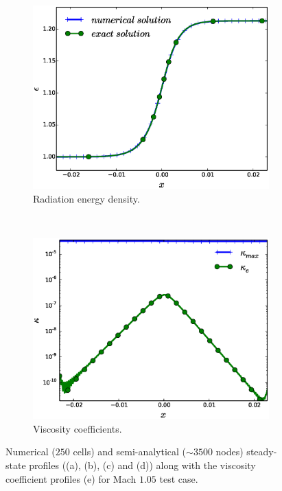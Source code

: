 \documentclass[times,doublespace]{fldauth}%
\begin{document}
\begin{figure}[h]
    \begin{center}    
    \begin{subfigure}{0.32\textwidth}
    \centering
    \includegraphics[width=\linewidth]{figures/cst-xs/mach-1p05/mass-diff-mach-1p05-radiation-nel-250-plot.eps}
    \caption{Radiation energy density.}\label{fig:mach-1p05-cst-xs-radiation}
    \end{subfigure}        
    ~
    \begin{subfigure}{0.32\textwidth}
    \centering
    \includegraphics[width=\linewidth]{figures/cst-xs/mach-1p05/mass-diff-mach-1p05-visc-nel-250-plot.eps}
    \caption{Viscosity coefficients.}\label{fig:mach-1p05-cst-xs-visc}
    \end{subfigure}        
    \end{center}
\caption{Numerical ($250$ cells) and semi-analytical ($\sim 3500$ nodes) steady-state profiles ((a), (b), (c) and (d)) along with the viscosity coefficient profiles (e) for Mach $1.05$ test case.}\label{fig:mach-1p05-cst-xs}    
\end{figure}
%
\pagebreak
\end{document}
